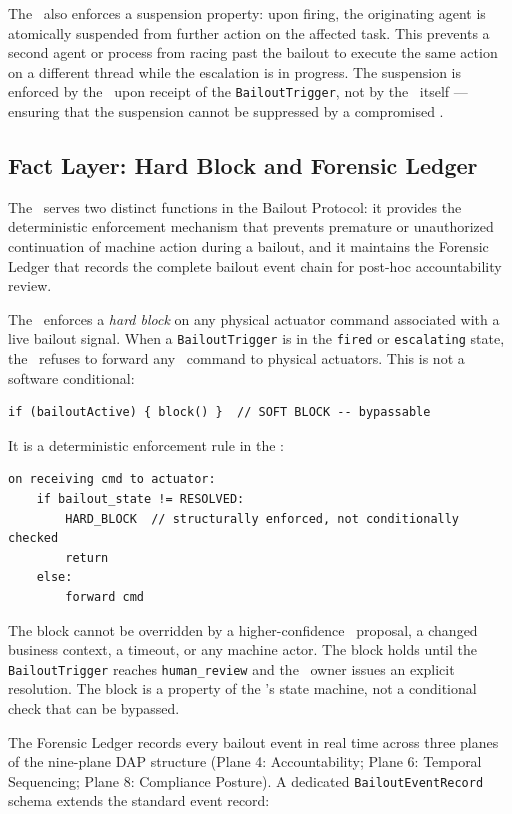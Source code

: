 The \bounds\ also enforces a suspension property: upon firing, the originating agent is atomically suspended from further action on the affected task. This prevents a second agent or process from racing past the bailout to execute the same action on a different thread while the escalation is in progress. The suspension is enforced by the \fact\ upon receipt of the \texttt{BailoutTrigger}, not by the \bounds\ itself --- ensuring that the suspension cannot be suppressed by a compromised \bounds.

\subsection{Fact Layer: Hard Block and Forensic Ledger}
\label{sec:fact-enforcement}

The \fact\ serves two distinct functions in the Bailout Protocol: it provides the deterministic enforcement mechanism that prevents premature or unauthorized continuation of machine action during a bailout, and it maintains the Forensic Ledger that records the complete bailout event chain for post-hoc accountability review.

The \fact\ enforces a \textit{hard block} on any physical actuator command associated with a live bailout signal. When a \texttt{BailoutTrigger} is in the \texttt{fired} or \texttt{escalating} state, the \fact\ refuses to forward any \bounds\ command to physical actuators. This is not a software conditional:

\begin{verbatim}
if (bailoutActive) { block() }  // SOFT BLOCK -- bypassable
\end{verbatim}

It is a deterministic enforcement rule in the \fact:

\begin{verbatim}
on receiving cmd to actuator:
    if bailout_state != RESOLVED:
        HARD_BLOCK  // structurally enforced, not conditionally checked
        return
    else:
        forward cmd
\end{verbatim}

The block cannot be overridden by a higher-confidence \bounds\ proposal, a changed business context, a timeout, or any machine actor. The block holds until the \texttt{BailoutTrigger} reaches \texttt{human\_review} and the \purpose\ owner issues an explicit resolution. The block is a property of the \fact's state machine, not a conditional check that can be bypassed.

The Forensic Ledger records every bailout event in real time across three planes of the nine-plane DAP structure (Plane 4: Accountability; Plane 6: Temporal Sequencing; Plane 8: Compliance Posture). A dedicated \texttt{BailoutEventRecord} schema extends the standard event record:

